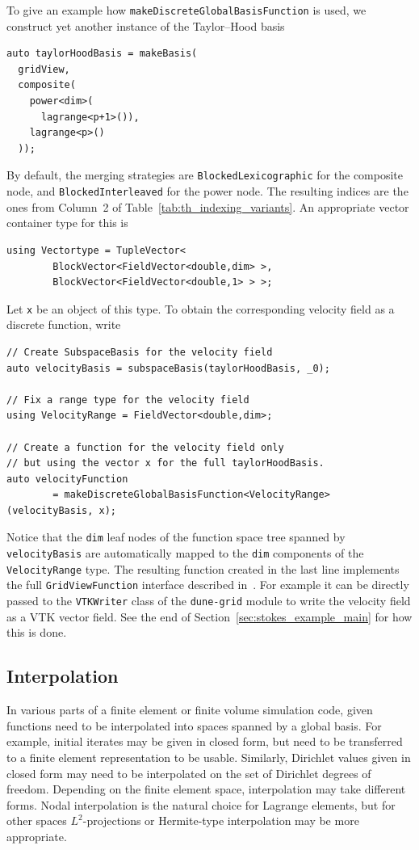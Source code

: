 \documentclass[a4paper,10pt,headings=normal,bibliography=totoc]{scrartcl}
\newcommand{\cpp}[1]{\lstinline[basicstyle=\ttfamily]!#1!}
\newcommand{\dunemodule}[1]{\texttt{#1}}
\begin{document}
To give an example how \cpp{makeDiscreteGlobalBasisFunction} is used,
we construct yet another instance of the Taylor--Hood basis
%
\begin{lstlisting}[style=Example]
auto taylorHoodBasis = makeBasis(
  gridView,
  composite(
    power<dim>(
      lagrange<p+1>()),
    lagrange<p>()
  ));
\end{lstlisting}
By default, the merging strategies are \cpp{BlockedLexicographic} for the composite node,
and \cpp{BlockedInterleaved} for the power node.  The resulting indices are the ones
from Column~2 of Table~\ref{tab:th_indexing_variants}.  An appropriate vector container
type for this is
\begin{lstlisting}[style=Example]
using Vectortype = TupleVector<
        BlockVector<FieldVector<double,dim> >,
        BlockVector<FieldVector<double,1> > >;
\end{lstlisting}
Let \cpp{x} be an object of this type.  To obtain the corresponding velocity field
as a discrete function, write
%
\begin{lstlisting}[style=Example]
// Create SubspaceBasis for the velocity field
auto velocityBasis = subspaceBasis(taylorHoodBasis, _0);

// Fix a range type for the velocity field
using VelocityRange = FieldVector<double,dim>;

// Create a function for the velocity field only
// but using the vector x for the full taylorHoodBasis.
auto velocityFunction
        = makeDiscreteGlobalBasisFunction<VelocityRange>(velocityBasis, x);
\end{lstlisting}

Notice that the \cpp{dim} leaf nodes of the function space
tree spanned by \cpp{velocityBasis} are automatically mapped to the
\cpp{dim} components of the \cpp{VelocityRange} type.
The resulting function created in the last line implements the full \cpp{GridViewFunction}
interface described in~\cite{engwer_graeser_muething_sander:2015}.  For example
it can be directly
passed to the \cpp{VTKWriter} class of the
\dunemodule{dune-grid} module to write the velocity field
as a VTK vector field.
See the end of Section~\ref{sec:stokes_example_main}
for how this is done.



\subsection{Interpolation}

In various parts of a finite element or finite volume simulation code, given functions need to be interpolated
into spaces spanned by a global basis.  For example, initial iterates may be given in closed form, but need to be
transferred to a finite element representation to be usable.  Similarly, Dirichlet values given in closed form
may need to be interpolated on the set of Dirichlet degrees of freedom.  Depending on the finite element space,
interpolation may take different forms.  Nodal interpolation is the natural choice for Lagrange elements, but
for other spaces $L^2$-projections or Hermite-type interpolation may be more appropriate.
\end{document}
